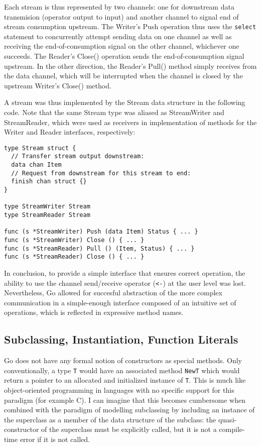 \documentclass {article}
\begin{document}
Each stream is thus represented by two channels: one for downstream data transmision (operator output to input) and another channel to signal end of stream consumption upstream. The Writer's Push operation thus uses the \lstinline|select| statement to concurrently attempt sending data on one channel as well as receiving the end-of-consumption signal on the other channel, whichever one succeeds. The Reader's Close() operation sends the end-of-consumption signal upstream. In the other direction, the Reader's Pull() method simply receives from the data channel, which will be interrupted when the channel is closed by the upstream Writer's Close() method.

A stream was thus implemented by the Stream data structure in the following code. Note that the same Stream type was aliased as StreamWriter and StreamReader, which were used as receivers in implementation of methods for the Writer and Reader interfaces, respectively:

\begin{lstlisting}
type Stream struct {
  // Transfer stream output downstream:
  data chan Item
  // Request from downstream for this stream to end:
  finish chan struct {}
}

type StreamWriter Stream
type StreamReader Stream

func (s *StreamWriter) Push (data Item) Status { ... }
func (s *StreamWriter) Close () { ... }
func (s *StreamReader) Pull () (Item, Status) { ... }
func (s *StreamReader) Close () { ... }
\end{lstlisting}

In conclusion, to provide a simple interface that ensures correct operation, the ability to use the channel send/receive operator (\lstinline|<-|) at the user level was lost. Nevertheless, Go allowed for succesful abstraction of the more complex communication in a simple-enough interface composed of an intuitive set of operations, which is reflected in expressive method names.


\subsection{Subclassing, Instantiation, Function Literals}

Go does not have any formal notion of constructors as special methods. Only conventionally, a type \lstinline|T| would have an associated method \lstinline|NewT| which would return a pointer to an allocated and initialized instance of \lstinline|T|. This is much like object-oriented programming in languages with no specific support for this paradigm (for example C). I can imagine that this becomes cumbersome when combined with the paradigm of modelling subclassing by including an instance of the superclass as a member of the data structure of the subclass: the quasi-constructor of the superclass must be explicitly called, but it is not a compile-time error if it is not called.
\end{document}
